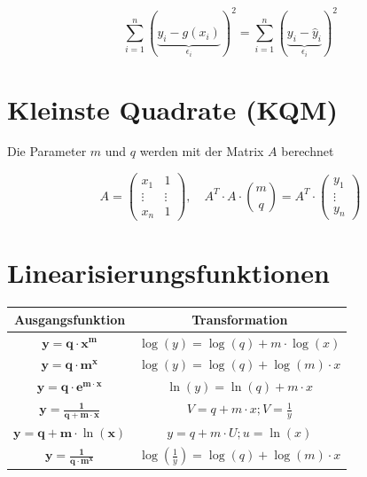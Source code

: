 \documentclass[10pt]{article}
\begin{document}
$$
\sum_{i=1}^{n}(\underbrace{y_{i}-g\left(x_{i}\right)}_{\epsilon_{i}})^{2}=\sum_{i=1}^{n}(\underbrace{y_{i}-\hat{y}_{i}}_{\epsilon_{i}})^{2}
$$

\section*{Kleinste Quadrate (KQM)}
Die Parameter $m$ und $q$ werden mit der Matrix $A$ berechnet

$$
A=\left(\begin{array}{cc}
x_{1} & 1 \\
\vdots & \vdots \\
x_{n} & 1
\end{array}\right), \quad A^{T} \cdot A \cdot\binom{m}{q}=A^{T} \cdot\left(\begin{array}{c}
y_{1} \\
\vdots \\
y_{n}
\end{array}\right)
$$

\section*{Linearisierungsfunktionen}
\begin{center}
\begin{tabular}{|c|c|}
\hline
Ausgangsfunktion & Transformation \\
\hline
$\boldsymbol{y}=\boldsymbol{q} \cdot \boldsymbol{x}^{\boldsymbol{m}}$ & $\log (y)=\log (q)+m \cdot \log (x)$ \\
\hline
$\boldsymbol{y}=\boldsymbol{q} \cdot \boldsymbol{m}^{\boldsymbol{x}}$ & $\log (y)=\log (q)+\log (m) \cdot x$ \\
\hline
$\boldsymbol{y}=\boldsymbol{q} \cdot \boldsymbol{e}^{\boldsymbol{m} \cdot \boldsymbol{x}}$ & $\ln (y)=\ln (q)+m \cdot x$ \\
\hline
$\boldsymbol{y}=\frac{\mathbf{1}}{\boldsymbol{q}+\boldsymbol{m} \cdot \boldsymbol{x}}$ & $V=q+m \cdot x ; V=\frac{1}{y}$ \\
\hline
$\boldsymbol{y}=\boldsymbol{q}+\boldsymbol{m} \cdot \ln (\boldsymbol{x})$ & $y=q+m \cdot U ; u=\ln (x)$ \\
\hline
$\boldsymbol{y}=\frac{\mathbf{1}}{\boldsymbol{q} \cdot \boldsymbol{m}^{\boldsymbol{x}}}$ & $\log \left(\frac{1}{y}\right)=\log (q)+\log (m) \cdot x$ \\
\hline
\end{tabular}
\end{center}
\end{document}
